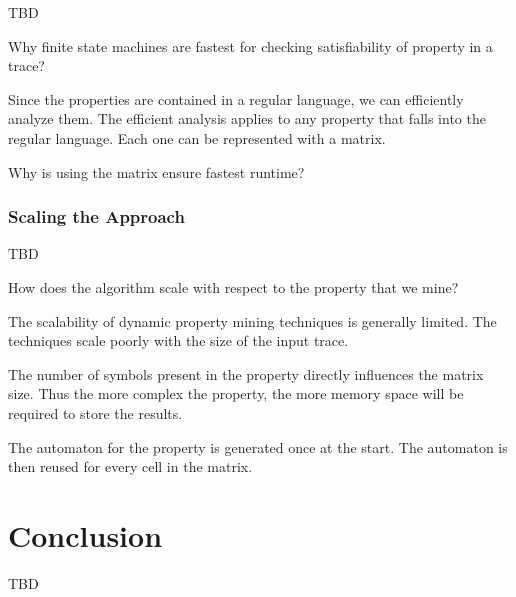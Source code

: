 \documentclass[]{sigplanconf}
\begin{document}
TBD

Why finite state machines are fastest for checking satisfiability of property in a trace?

Since the properties are contained in a regular language, we can efficiently analyze them. The efficient analysis applies to any property that falls into the regular language. Each one can be represented with a matrix.

Why is using the matrix ensure fastest runtime?

\subsubsection{Scaling the Approach}

TBD

How does the algorithm scale with respect to the property that we mine?

The scalability of dynamic property mining techniques is generally limited.
The techniques scale poorly with the size of the input trace.


The number of symbols present in the property directly influences the matrix size. Thus the more complex the property, the more memory space will be required to store the results.

The automaton for the property is generated once at the start. The automaton is then reused for every cell in the matrix.

\section{Conclusion}

TBD


%


\end{document}
